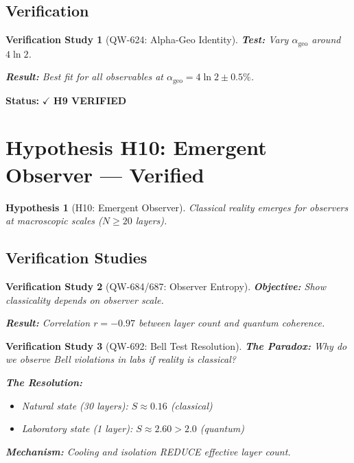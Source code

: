 \documentclass[11pt, a4paper]{article}
\newtheorem{hypothesis}{Hypothesis}[section]
\newtheorem{verification}{Verification Study}[section]
\theoremstyle{remark}
\newcommand{\alphageo}{\alpha_{\text{geo}}}
\begin{document}
\subsection{Verification}

\begin{verification}[QW-624: Alpha-Geo Identity]
\textbf{Test:} Vary $\alphageo$ around $4\ln 2$.

\textbf{Result:} Best fit for all observables at $\alphageo = 4\ln 2 \pm 0.5\%$.
\end{verification}

\textbf{Status:} $\checkmark$ \textbf{H9 VERIFIED}

\section{Hypothesis H10: Emergent Observer --- Verified}

\begin{hypothesis}[H10: Emergent Observer]
Classical reality emerges for observers at macroscopic scales ($N \geq 20$ layers).
\end{hypothesis}

\subsection{Verification Studies}

\begin{verification}[QW-684/687: Observer Entropy]
\textbf{Objective:} Show classicality depends on observer scale.

\textbf{Result:} Correlation $r = -0.97$ between layer count and quantum coherence.
\end{verification}

\begin{verification}[QW-692: Bell Test Resolution]
\textbf{The Paradox:} Why do we observe Bell violations in labs if reality is classical?

\textbf{The Resolution:}
\begin{itemize}
    \item Natural state (30 layers): $S \approx 0.16$ (classical)
    \item Laboratory state (1 layer): $S \approx 2.60 > 2.0$ (quantum)
\end{itemize}

\textbf{Mechanism:} Cooling and isolation REDUCE effective layer count.
\end{verification}
\end{document}
